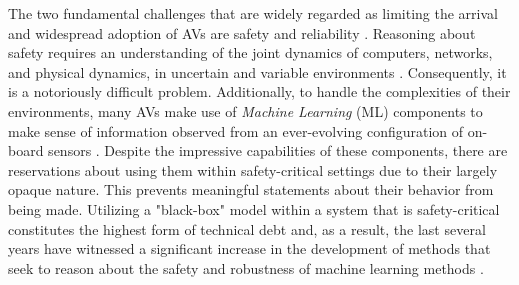 \documentclass[manuscript,screen,review]{acmart}
\begin{document}
The two fundamental challenges that are widely regarded as limiting the arrival and widespread adoption of AVs are safety and reliability \cite{Majumdar2017}. Reasoning about safety requires an understanding of the joint dynamics of computers, networks, and physical dynamics, in uncertain and variable environments \cite{Yurtsever2019}. Consequently, it is a notoriously difficult problem. Additionally, to handle the complexities of their environments, many AVs make use of \emph{Machine Learning} (ML) components to make sense of information observed from an ever-evolving configuration of on-board sensors \cite{Yurtsever2019}. Despite the impressive capabilities of these components, there are reservations about using them within safety-critical settings due to their largely opaque nature. This prevents meaningful statements about their behavior from being made. Utilizing a "black-box" model within a system that is safety-critical constitutes the highest form of technical debt \cite{Sculley2015} and, as a result, the last several years have witnessed a significant increase in the development of methods that seek to reason about the safety and robustness of machine learning methods \cite{xiang20118survey}.




\end{document}
